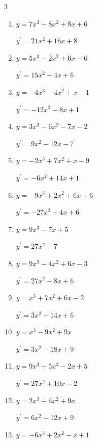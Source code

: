 \begin{multicols}{3}
\begin{enumerate}
        $\displaystyle y^{\prime}=27x^{2}+2x+2$

  \item $y=7x^{3}+8x^{2}+8x+6$

        $\displaystyle y^{\prime}=21x^{2}+16x+8$

  \item $y=5x^{3}-2x^{2}+6x-6$

        $\displaystyle y^{\prime}=15x^{2}-4x+6$

  \item $y=-4x^{3}-4x^{2}+x-1$

        $\displaystyle y^{\prime}=-12x^{2}-8x+1$

  \item $y=3x^{3}-6x^{2}-7x-2$

        $\displaystyle y^{\prime}=9x^{2}-12x-7$

\columnbreak %

  \item $y=-2x^{3}+7x^{2}+x-9$

        $\displaystyle y^{\prime}=-6x^{2}+14x+1$

  \item $y=-9x^{3}+2x^{2}+6x+6$

        $\displaystyle y^{\prime}=-27x^{2}+4x+6$

  \item $y=9x^{3}-7x+5$

        $\displaystyle y^{\prime}=27x^{2}-7$

  \item $y=9x^{3}-4x^{2}+6x-3$

        $\displaystyle y^{\prime}=27x^{2}-8x+6$

  \item $y=x^{3}+7x^{2}+6x-2$

        $\displaystyle y^{\prime}=3x^{2}+14x+6$

  \item $y=x^{3}-9x^{2}+9x$

        $\displaystyle y^{\prime}=3x^{2}-18x+9$

  \item $y=9x^{3}+5x^{2}-2x+5$

        $\displaystyle y^{\prime}=27x^{2}+10x-2$

  \item $y=2x^{3}+6x^{2}+9x$

        $\displaystyle y^{\prime}=6x^{2}+12x+9$

  \item $y=-6x^{3}+2x^{2}-x+1$


\end{enumerate}
\end{multicols}
